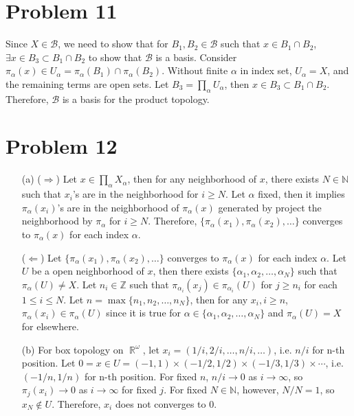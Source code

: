 \documentclass{article}
\DeclareMathOperator{\rr}{\mathbb{R}}
\newcommand{\B}{\mathcal{B}}
\begin{document}
\section*{Problem 11} Since $X\in \B$, we need to show that for $B_1,B_2\in \B$ such that $x\in B_1\cap B_2$, $\exists x\in B_3\subset B_1\cap B_2$ to show that $\B$ is a basis. Consider $\pi_\alpha(x)\in U_\alpha=\pi_\alpha(B_1)\cap \pi_\alpha(B_2)$. Without finite $\alpha$ in index set, $U_\alpha=X$, and the remaining terms are open sets. Let $B_3=\prod_\alpha U_\alpha$, then $x\in B_3\subset B_1\cap B_2$. Therefore, $\B$ is a basis for the product topology.
\section*{Problem 12} 
\begin{enumerate}
\item[(a)]
($\Rightarrow$) Let $x\in \prod_\alpha X_\alpha$, then for any neighborhood of $x$, there exists $N\in\mathbb{N}$ such that $x_i$'s are in the neighborhood for $i\geq N$. Let $\alpha$ fixed, then it implies $\pi_\alpha(x_i)$'s are in the neighborhood of $\pi_\alpha(x)$ generated by project the neighborhood by $\pi_\alpha$ for $i\geq N$. Therefore, $\{\pi_\alpha(x_1),\pi_\alpha(x_2),\ldots\}$ converges to $\pi_\alpha(x)$ for each index $\alpha$.

($\Leftarrow$) Let $\{\pi_\alpha(x_1),\pi_\alpha(x_2),\ldots\}$ converges to $\pi_\alpha(x)$ for each index $\alpha$. Let $U$ be a open neighborhood of $x$, then there exists $\{\alpha_1,\alpha_2,\ldots,\alpha_N\}$ such that $\pi_\alpha(U)\neq X$. Let $n_i\in \mathbb{Z}$ such that $\pi_{\alpha_i}(x_j)\in \pi_{\alpha_i}(U)$ for $j\geq n_i$ for each $1\leq i\leq N$. Let $n=\max\{n_1, n_2, \ldots, n_N\}$, then for any $x_i,i\geq n$, $\pi_\alpha(x_i)\in \pi_\alpha(U)$ since it is true for $\alpha\in \{\alpha_1,\alpha_2,\ldots,\alpha_N\}$ and $\pi_\alpha(U)=X$ for elsewhere.
\item[(b)] For box topology on $\rr^\omega$, let $x_i=(1/i, 2/i, \ldots, n/i, \ldots)$, i.e. $n/i$ for n-th position. Let $0=x\in U=(-1, 1)\times (-1/2, 1/2)\times (-1/3,1/3)\times \cdots$, i.e. $(-1/n, 1/n)$ for n-th position. For fixed $n$, $n/i\rightarrow 0$ as $i\rightarrow \infty$, so $\pi_j(x_i)\rightarrow 0$ as $i\rightarrow \infty$ for fixed $j$. For fixed $N\in \mathbb{N}$, however, $N/N=1$, so $x_N\notin U$. Therefore, $x_i$ does not converges to $0$.
\end{enumerate}
\end{document}
